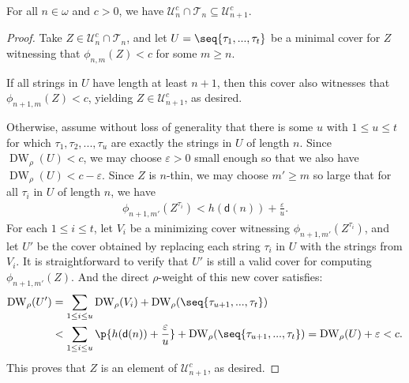 \begin{lemma}
    \label{lemma:use_n_thin_to_pass_n_to_n+1}
    For all $n \in \omega$ and $c > 0$, we have $\mathcal{U}^c_n \cap \mathcal{T}_n \subseteq \mathcal{U}^c_{n+1}.$
\end{lemma}
\begin{proof}
    Take $Z \in \mathcal{U}^c_n \cap \mathcal{T}_n$, and let $U = \seq{\tau_1, ..., \tau_t}$ be a minimal cover for $Z$ witnessing that $\phi_{n, m}(Z) < c$ for some $m \geq n$. 
    
    If all strings in $U$ have length at least $n + 1$, then this cover also witnesses that $\phi_{n+1, m}(Z) < c$, yielding $Z \in \mathcal{U}^c_{n + 1}$, as desired. 
    
    Otherwise, assume without loss of generality that there is some $u$ with $1 \leq u \leq t$ for which $\tau_1, \tau_2, ..., \tau_u$ are exactly the strings in $U$ of length $n$. Since $\operatorname{DW}_\rho(U) < c$, we may choose $\varepsilon > 0$ small enough so that we also have $\operatorname{DW}_\rho(U) < c - \varepsilon.$ Since $Z$ is $n$-thin, we may choose $m' \geq m$ so large that for all $\tau_i$ in $U$ of length $n$, we have
    \begin{align*}
        \phi_{n+1, m'}(Z^{\tau_i}) < h(\mathsf{d}(n)) + \frac{\varepsilon}{u}.
    \end{align*}
    For each $1 \leq i \leq t$, let $V_i$ be a minimizing cover witnessing $\phi_{n + 1, m'}(Z^{\tau_i})$, and let $U'$ be the cover obtained by replacing each string $\tau_i$ in $U$ with the strings from $V_i$. It is straightforward to verify that $U'$ is still a valid cover for computing $\phi_{n+1, m'}(Z)$. And the direct $\rho$-weight of this new cover satisfies:
    \begin{align*}
        \operatorname{DW}_\rho(U') &= \sum_{1 \leq i \leq u} \operatorname{DW}_\rho(V_i) + \operatorname{DW}_\rho(\seq{\tau_{u + 1}, ..., \tau_t})\\
        &< \sum_{1 \leq i \leq u} \p{h(\mathsf{d}(n)) + \frac{\varepsilon}{u}} + \operatorname{DW}_\rho(\seq{\tau_{u + 1}, ..., \tau_t}) = \operatorname{DW}_\rho(U) + \varepsilon < c.
    \end{align*}
    This proves that $Z$ is an element of $\mathcal{U}_{n+1}^c$, as desired.
\end{proof}

